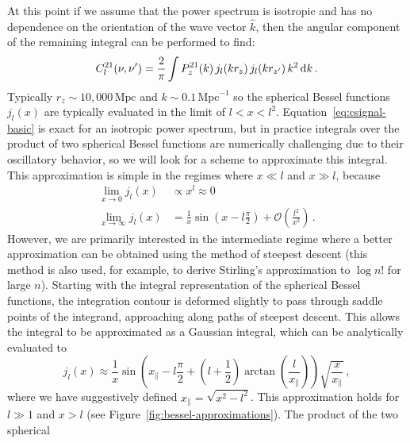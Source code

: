 \begin{bibunit}
\begin{subappendices}
At this point if we assume that the power spectrum is isotropic and has no dependence on the
orientation of the wave vector $\hat k$, then the angular component of the remaining integral can be
performed to find:
\begin{equation}\label{eq:csignal-basic}
    C^{21}_l(\nu, \nu^\prime) =
        \frac{2}{\pi}
        \int
        P_z^{21}(k) \,
        j_l(k r_z) \,
        j_l(k r_{z^\prime}) \,
        k^2 \, {\textrm d} k\,.
\end{equation}
Typically $r_z\sim 10,000\,\text{Mpc}$ and $k\sim 0.1\,\text{Mpc}^{-1}$ so the spherical Bessel
functions $j_l(x)$ are typically evaluated in the limit of $l < x < l^2$.
Equation~\ref{eq:csignal-basic} is exact for an isotropic power spectrum, but in practice integrals
over the product of two spherical Bessel functions are numerically challenging due to their
oscillatory behavior, so we will look for a scheme to approximate this integral.  This approximation
is simple in the regimes where $x \ll l$ and $x \gg l$, because
\begin{align}
    \lim_{x\rightarrow 0} j_l(x) &\propto x^l \approx 0 \\
    \lim_{x\rightarrow\infty} j_l(x) &=
        \frac{1}{x} \sin\left(x - l\frac{\pi}{2}\right)
        + \mathcal{O}\left(\frac{l^2}{x^2}\right)
    \,.
\end{align}
However, we are primarily interested in the intermediate regime where a better approximation can be
obtained using the method of steepest descent (this method is also used, for example, to derive
Stirling's approximation to $\log n!$ for large $n$). Starting with the integral representation of
the spherical Bessel functions, the integration contour is deformed slightly to pass through saddle
points of the integrand, approaching along paths of steepest descent. This allows the integral to be
approximated as a Gaussian integral, which can be analytically evaluated to
\begin{equation}
    j_l(x) \approx
        \frac{1}{x}
        \sin\left(
            x_\parallel - l\frac{\pi}{2}
            + \left(l+\frac{1}{2}\right)\arctan\left(\frac{l}{x_\parallel}\right)
        \right)
        \sqrt{\frac{x}{x_\parallel}}
    \,,
\end{equation}
where we have suggestively defined $x_\parallel = \sqrt{x^2-l^2}$.  This approximation holds for
$l\gg 1$ and $x > l$ (see Figure~\ref{fig:bessel-approximations}). The product of the two spherical

\end{subappendices}
\end{bibunit}
